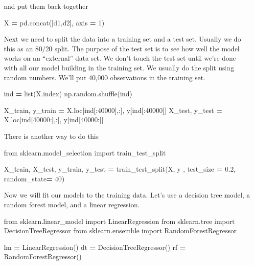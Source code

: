 \documentclass[
  letterpaper,
]{scrbook}
\newenvironment{Shaded}{\begin{snugshade}}{\end{snugshade}}
\newcommand{\BuiltInTok}[1]{#1}
\newcommand{\DecValTok}[1]{\textcolor[rgb]{0.00,0.00,0.81}{#1}}
\newcommand{\FloatTok}[1]{\textcolor[rgb]{0.00,0.00,0.81}{#1}}
\newcommand{\ImportTok}[1]{#1}
\newcommand{\NormalTok}[1]{#1}
\newcommand{\OperatorTok}[1]{\textcolor[rgb]{0.81,0.36,0.00}{\textbf{#1}}}
\begin{document}
and put them back together

\begin{Shaded}
\begin{Highlighting}[]
\NormalTok{X }\OperatorTok{=}\NormalTok{ pd.concat([d1,d2], axis }\OperatorTok{=} \DecValTok{1}\NormalTok{)}
\end{Highlighting}
\end{Shaded}

Next we need to split the data into a training set and a test set. Usually we do this as an 80/20 split.
The purpose of the test set is to see how well the model works on an ``external'' data set. We don't touch the
test set until we're done with all our model building in the training set. We usually do the split using
random numbers. We'll put 40,000 observations in the training set.

\begin{Shaded}
\begin{Highlighting}[]
\NormalTok{ind }\OperatorTok{=} \BuiltInTok{list}\NormalTok{(X.index)}
\NormalTok{np.random.shuffle(ind)}

\NormalTok{X\_train, y\_train }\OperatorTok{=}\NormalTok{ X.loc[ind[:}\DecValTok{40000}\NormalTok{],:], y[ind[:}\DecValTok{40000}\NormalTok{]]}
\NormalTok{X\_test, y\_test }\OperatorTok{=}\NormalTok{ X.loc[ind[}\DecValTok{40000}\NormalTok{:],:], y[ind[}\DecValTok{40000}\NormalTok{:]]}
\end{Highlighting}
\end{Shaded}

There is another way to do this

\begin{Shaded}
\begin{Highlighting}[]
\ImportTok{from}\NormalTok{ sklearn.model\_selection }\ImportTok{import}\NormalTok{ train\_test\_split}

\NormalTok{X\_train, X\_test, y\_train, y\_test }\OperatorTok{=}\NormalTok{ train\_test\_split(X, y , test\_size }\OperatorTok{=} \FloatTok{0.2}\NormalTok{, random\_state}\OperatorTok{=} \DecValTok{40}\NormalTok{)}
\end{Highlighting}
\end{Shaded}

Now we will fit our models to the training data. Let's use a decision tree model, a random forest model, and a linear regression.

\begin{Shaded}
\begin{Highlighting}[]
\ImportTok{from}\NormalTok{ sklearn.linear\_model }\ImportTok{import}\NormalTok{ LinearRegression}
\ImportTok{from}\NormalTok{ sklearn.tree }\ImportTok{import}\NormalTok{ DecisionTreeRegressor}
\ImportTok{from}\NormalTok{ sklearn.ensemble }\ImportTok{import}\NormalTok{ RandomForestRegressor}

\NormalTok{lm }\OperatorTok{=}\NormalTok{ LinearRegression()}
\NormalTok{dt }\OperatorTok{=}\NormalTok{ DecisionTreeRegressor()}
\NormalTok{rf }\OperatorTok{=}\NormalTok{ RandomForestRegressor()}
\end{Highlighting}
\end{Shaded}
\end{document}
